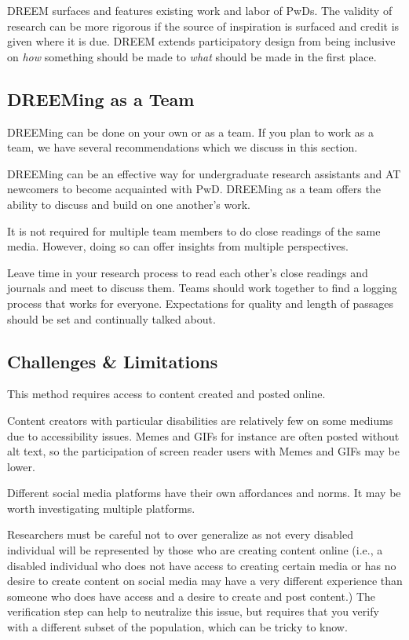 DREEM surfaces and features existing work and labor of PwDs. The validity of research can be more rigorous if the source of inspiration is surfaced and credit is given where it is due. DREEM extends participatory design from being inclusive on \textit{how} something should be made to \textit{what} should be made in the first place.

\subsection{DREEMing as a Team}
DREEMing can be done on your own or as a team. If you plan to work as a team, we have several recommendations which we discuss in this section.

DREEMing can be an effective way for undergraduate research assistants and AT newcomers to become acquainted with PwD. DREEMing as a team offers the ability to discuss and build on one another's work. 

It is not required for multiple team members to do close readings of the same media. However, doing so can offer insights from multiple perspectives. 

Leave time in your research process to read each other's close readings and journals and meet to discuss them. Teams should work together to find a logging process that works for everyone. Expectations for quality and length of passages should be set and continually talked about. 


\subsection{Challenges \& Limitations}

This method requires access to content created and posted online. 

Content creators with particular disabilities are relatively few on some mediums due to accessibility issues. Memes and GIFs for instance are often posted without alt text,\cite{gleasonMakingGIFsAccessible2020} so the participation of screen reader users with Memes and GIFs may be lower. 

Different social media platforms have their own affordances and norms. It may be worth investigating multiple platforms. 

Researchers must be careful not to over generalize as not every disabled individual will be represented by those who are creating content online (i.e., a disabled individual who does not have access to creating certain media or has no desire to create content on social media may have a very different experience than someone who does have access and a desire to create and post content.) The verification step can help to neutralize this issue, but requires that you verify with a different subset of the population, which can be tricky to know. 



